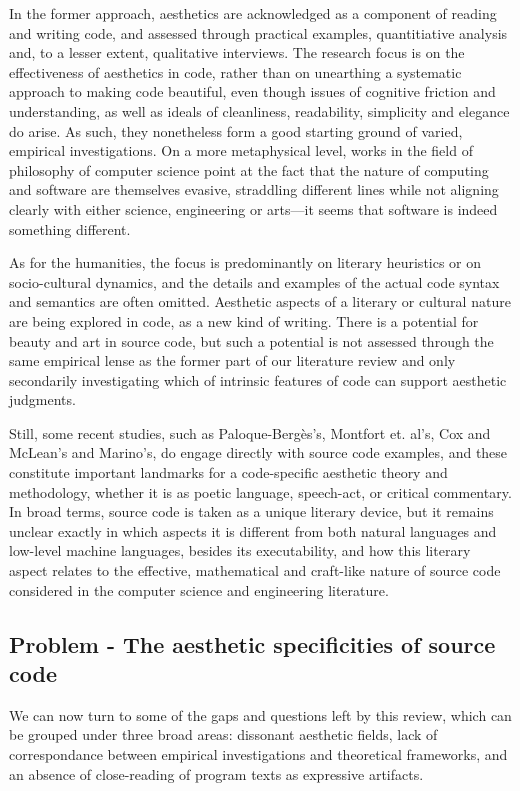 In the former approach, aesthetics are acknowledged as a component of reading and writing code, and assessed through practical examples, quantitiative analysis and, to a lesser extent, qualitative interviews. The research focus is on the effectiveness of aesthetics in code, rather than on unearthing a systematic approach to making code beautiful, even though issues of cognitive friction and understanding, as well as ideals of cleanliness, readability, simplicity and elegance do arise. As such, they nonetheless form a good starting ground of varied, empirical investigations.
On a more metaphysical level, works in the field of philosophy of computer science point at the fact that the nature of computing and software are themselves evasive, straddling different lines while not aligning clearly with either science, engineering or arts—it seems that software is indeed something different.

As for the humanities, the focus is predominantly on literary heuristics or on socio-cultural dynamics, and the details and examples of the actual code syntax and semantics are often omitted. Aesthetic aspects of a literary or cultural nature are being explored in code, as a new kind of writing. There is a potential for beauty and art in source code, but such a potential is not assessed through the same empirical lense as the former part of our literature review and only secondarily investigating which of intrinsic features of code can support aesthetic judgments.

Still, some recent studies, such as Paloque-Bergès's, Montfort et. al's, Cox and McLean's and Marino's, do engage directly with source code examples, and these constitute important landmarks for a code-specific aesthetic theory and methodology, whether it is as poetic language, speech-act, or critical commentary. In broad terms, source code is taken as a unique literary device, but it remains unclear exactly in which aspects it is different from both natural languages and low-level machine languages, besides its executability, and how this literary aspect relates to the effective, mathematical and craft-like nature of source code considered in the computer science and engineering literature.

\subsection{Problem - The aesthetic specificities of source code}

We can now turn to some of the gaps and questions left by this review, which can be grouped under three broad areas: dissonant aesthetic fields, lack of correspondance between empirical investigations and theoretical frameworks, and an absence of close-reading of program texts as expressive artifacts.

